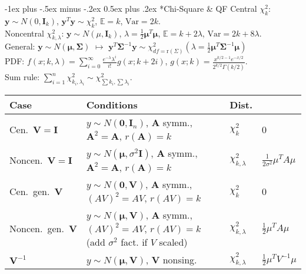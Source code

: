 \documentclass[10pt,landscape]{article}
\makeatletter
\renewcommand{\subsection}{\@startsection{subsection}{2}{0mm}%
                                {-1ex plus -.5ex minus -.2ex}%
                                {0.5ex plus .2ex}%
                                {\normalfont\small\bfseries}}
\makeatother
\begin{document}
\begin{multicols}{3}
\subsection*{Chi-Square \& QF}
Central $\chi^2_k$: $\mathbf{y} \sim N(0,\mathbf{I}_k)$, $\mathbf{y}^T\mathbf{y} \sim \chi^2_k$, $\mathbb E=k$, $\mathrm{Var}=2k$.\\
Noncentral $\chi^2_{k,\lambda}$: $\mathbf{y} \sim N(\mu,\mathbf{I}_k)$, $\lambda=\frac{1}{2}\boldsymbol\mu^T\boldsymbol\mu$, $\mathbb E=k+2\lambda$, $\mathrm{Var}=2k+8\lambda$.\\
General: $\mathbf{y} \sim N(\boldsymbol\mu,\boldsymbol{\Sigma})$ $\mapsto$ $\mathbf{y}^T\boldsymbol{\Sigma}^{-1}\mathbf{y} \sim \chi^2_{df= \mathrm{r}(\Sigma)}(\lambda=\frac{1}{2}\boldsymbol\mu^T\boldsymbol{\Sigma}^{-1}\boldsymbol\mu)$\\
\medskip
PDF:
$f(x;k,\lambda) = \sum_{i=0}^\infty \frac{e^{-\lambda}\lambda^i}{i!} g(x;k+2i)$,  
$g(x;k) = \frac{x^{k/2-1} e^{-x/2}}{2^{k/2}\Gamma(k/2)}$.\\
Sum rule: $\sum_{i=1}^n \chi^2_{k_i,\lambda_i} \sim \chi^2_{\sum k_i, \sum\lambda_i}$.  \\
\medskip
\renewcommand{\arraystretch}{1.05}
\begin{tabular}{|p{0.9cm}|p{3.3cm}|p{0.6cm}|p{1.3cm}|}
\hline
\textbf{Case} & \textbf{Conditions} & \textbf{Dist.} & \boldmath{$\lambda$} \\
\hline
Cen.\ $\mathbf{V}=\mathbf{I}$& $y\!\sim\! N(\boldsymbol 0,\mathbf{I}_n)$, $\mathbf{A}$ symm., $\mathbf{A}^2=\mathbf{A}$, $r(\mathbf{A})=k$& $\chi^2_k$ & 0 \\
\hline
Noncen.\ $\mathbf{V}=\mathbf{I}$& $y\!\sim\! N(\boldsymbol\mu,\sigma^2\mathbf{I})$, $\mathbf{A}$ symm., $\mathbf{A}^2=\mathbf{A}$, $r(\mathbf{A})=k$& $\chi^2_{k,\lambda}$ & $\frac{1}{2\sigma^2}\mu^T A\mu$ \\
\hline
Cen.\ gen.\ $\mathbf{V}$& $y\!\sim\! N(\boldsymbol 0,\mathbf{V})$, $\mathbf{A}$ symm., $({A}{V})^2 = {A}{V}$, $r({A}{V})=k$& $\chi^2_k$ & 0 \\
\hline
Noncen.\ gen.\ $\mathbf{V}$& $y\!\sim\! N(\boldsymbol\mu,\mathbf{V})$, $\mathbf{A}$ symm., $({A}{V})^2 = {A}{V}$, $r({A}{V})=k$ (add $\sigma^2$ fact. if ${V}$ scaled)& $\chi^2_{k,\lambda}$ & $\frac12\mu^T A\mu$\\
\hline
$\mathbf{V}^{-1}$& $y\!\sim\! N(\boldsymbol\mu,\mathbf{V})$, $\mathbf{V}$ nonsing.& $\chi^2_{k,\lambda}$ & $\frac12\mu^T V^{-1}\mu$ \\
\hline
\end{tabular}


\end{multicols}
\end{document}
